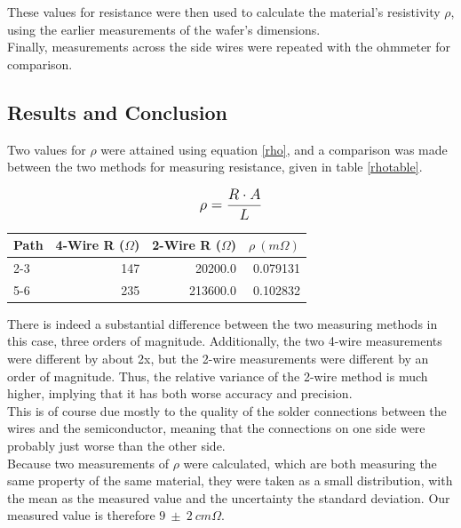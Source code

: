 \documentclass[aps,prl,reprint]{revtex4-2}
\begin{document}
These values for resistance were then used to calculate the material's resistivity $\rho$,
using the earlier measurements of the wafer's dimensions. \\

Finally, measurements across the side wires were repeated with the ohmmeter for comparison. \\

\subsection{Results and Conclusion}

Two values for $\rho$ were attained using equation \ref{rho}, and a comparison was
made between the two methods for measuring resistance, given in table \ref{rhotable}. 

\begin{equation}
	\mathlarger{\rho=\frac{R\cdot A}{L}}
    \label{rho}
\end{equation}

\begin{table}[h!]
\renewcommand{\arraystretch}{1.45}
\setlength{\tabcolsep}{10pt}
\begin{tabular}{lrrr}
\toprule
Path &  4-Wire R ($\Omega$) &  2-Wire R ($\Omega$) &       $\rho\ (m\Omega)$ \\
\midrule
2-3 &         147 &     20200.0 &  0.079131 \\
5-6 &         235 &    213600.0 &  0.102832 \\
\bottomrule
\end{tabular}
\end{table}
There is indeed a substantial difference between the two measuring methods in this case,
three orders of magnitude. Additionally, the two 4-wire measurements were different by about 2x,
but the 2-wire measurements were different by an order of magnitude. Thus, the relative variance
of the 2-wire method is much higher, implying that it has both worse accuracy and precision.\\

This is of course due mostly to the quality of the solder connections between the wires and the
semiconductor, meaning that the connections on one side were probably just worse than the other 
side.\\

Because two measurements of $\rho$ were calculated, which are both measuring the same property
of the same material, they were taken as a small distribution, with the mean as the measured
value and the uncertainty the standard deviation. Our measured value is therefore
$9\ \pm\ 2\ cm\Omega$.
\end{document}
